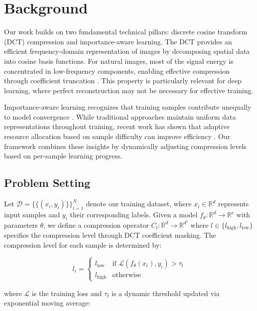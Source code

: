 \documentclass{article} %
\begin{document}
\section{Background}
\label{sec:background}

Our work builds on two fundamental technical pillars: discrete cosine transform (DCT) compression and importance-aware learning. The DCT provides an efficient frequency-domain representation of images by decomposing spatial data into cosine basis functions. For natural images, most of the signal energy is concentrated in low-frequency components, enabling effective compression through coefficient truncation \citep{wang2022learning}. This property is particularly relevant for deep learning, where perfect reconstruction may not be necessary for effective training.

Importance-aware learning recognizes that training samples contribute unequally to model convergence \citep{azimi2020structural}. While traditional approaches maintain uniform data representations throughout training, recent work has shown that adaptive resource allocation based on sample difficulty can improve efficiency \citep{Johnson2018TrainingDM}. Our framework combines these insights by dynamically adjusting compression levels based on per-sample learning progress.

\subsection{Problem Setting}
Let $\mathcal{D} = \{\{({x_i, y_i})\}\}_{i=1}^{N}$ denote our training dataset, where $x_i \in \mathbb{R}^{d}$ represents input samples and $y_i$ their corresponding labels. Given a model $f_\theta\colon \mathbb{R}^d \rightarrow \mathbb{R}^c$ with parameters $\theta$, we define a compression operator $C_{l}\colon \mathbb{R}^d \rightarrow \mathbb{R}^{d'}$ where $l \in \{l_{\text{high}}, l_{\text{low}}\}$ specifies the compression level through DCT coefficient masking. The compression level for each sample is determined by:

\begin{equation}
    l_i = \begin{cases}
        l_{\text{low}} & \text{if } \mathcal{L}(f_\theta(x_i), y_i) > \tau_t \\
        l_{\text{high}} & \text{otherwise}
    \end{cases}
\end{equation}

where $\mathcal{L}$ is the training loss and $\tau_t$ is a dynamic threshold updated via exponential moving average:
\end{document}
